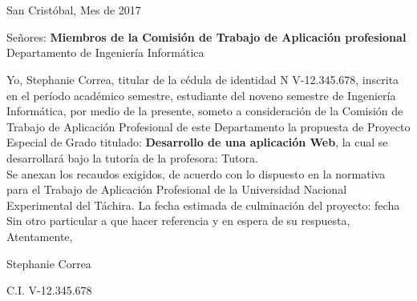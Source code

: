 \chapter*{}
\pagestyle{empty}
\thispagestyle{empty}
\begin{flushright}
\vspace*{-4cm}
San Crist\'obal, Mes de 2017
\end{flushright}

\vspace*{1cm}
\begin{flushleft}
Se\~nores:
\textbf{Miembros de la Comisi\'on de Trabajo de Aplicaci\'on profesional}
Departamento de Ingenier\'ia Inform\'atica
\end{flushleft}

\vspace*{1cm}

	Yo, Stephanie Correa, titular de la c\'edula de identidad N V-12.345.678, inscrita en el per\'iodo acad\'emico semestre, estudiante del noveno semestre de Ingenier\'ia Inform\'atica, por medio de la presente, someto a consideraci\'on de la Comisi\'on de Trabajo de Aplicaci\'on Profesional de este Departamento la propuesta de Proyecto Especial de Grado titulado: \textbf{Desarrollo de una aplicaci\'on Web}, la cual se desarrollar\'a bajo la tutor\'ia de la profesora: Tutora.\\
	
	
	Se anexan los recaudos exigidos, de acuerdo con lo dispuesto en la normativa para el Trabajo de Aplicaci\'on Profesional de la Universidad Nacional Experimental del T\'achira. La fecha estimada de culminaci\'on del  proyecto: fecha
	\\
	
	Sin otro particular a que hacer referencia y en espera de su respuesta,\\
	
	
	Atentamente,\\
	
	\vspace*{2cm}
	
	\begin{center}
	
	Stephanie Correa
	
	C.I. V-12.345.678
	\end{center}
	 